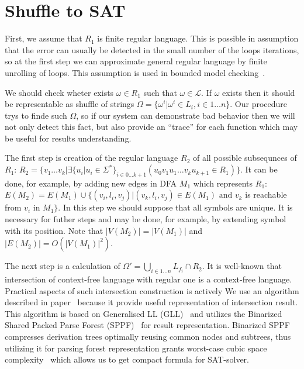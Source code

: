 \section{Shuffle to SAT}

First, we assume that $R_1$ is finite regular language.
This is possible in assumption that the error can usually be detected in the small number of the loops iterations,
so at the first step we can approximate general regular language by finite unrolling of loops.
This assumption is used in bounded model checking~\cite{BMC}.

We should check wheter exists $\omega \in R_1$ such that $\omega \in \mathcal{L}$.
If $\omega$ exists then it should be representable as shuffle of strings $\Omega = \{\omega^i | \omega^i \in L_i, i\in 1 \dots n\}$.
Our procedure trys to finde such $\Omega$, so if our system can demonstrate bad behavior then we will not only detect this fact, but also provide an ``trace'' for each function which may be useful for results understanding.

The first step is creation of the regular language $R_2$ of all possible subsequnces of $R_1$: $R_2 = \{ v_1 \dots v_k | \exists \{u_i| u_i \in \Sigma^* \}_{i\in 0 \dots k+1} (u_0 v_1 u_1 \dots v_k u_{k+1} \in R_1) \}$.
It can be done, for example, by adding new edges in DFA $M_1$ which represents $R_1$: $E(M_2)=E(M_1) \cup \{(v_i,l_i,v_j) | (v_k,l_i,v_j) \in E(M_1) \text{ and } v_k $ is reachable from $ v_i \text{ in } M_1\}$.
In this step we should suppose that all symbols are unique.
It is necessary for futher steps and may be done, for example, by extending symbol with its position.
Note that $|V(M_2)| = |V(M_1)|$ and $|E(M_2)| = O(|V(M_1)|^2)$.

The next step is a calculation of $\Omega' = \bigcup\limits_{i\in 1 \dots n} L_{f_i} \cap R_2$.
It is well-known that intersection of context-free language with regular one is a context-free language.
Practical aspects of such intersection construction is actively 
We use an algorithm described in paper~\cite{Grigorev} because it provide useful representation of intersection result.
This algorithm is based on Generalised LL (GLL)~\cite{scott2010gll} and utilizes the Binarized Shared Packed Parse Forest (SPPF)~\cite{brnglr, SPPF} for result representation.
Binarized SPPF compresses derivation trees optimally reusing common nodes and subtrees, thus utilizing it for parsing forest representation grants worst-case cubic space complexity~\cite{scott2010gll} which allows us to get compact formula for SAT-solver.

